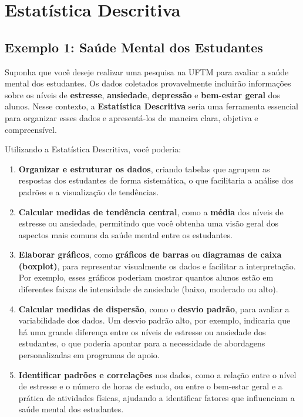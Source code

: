 \documentclass[
]{book}
\providecommand{\tightlist}{%
  \setlength{\itemsep}{0pt}\setlength{\parskip}{0pt}}
\begin{document}
\section{Estatística Descritiva}\label{estatuxedstica-descritiva}

\subsection{\texorpdfstring{Exemplo 1: \textbf{Saúde Mental dos Estudantes}}{Exemplo 1: Saúde Mental dos Estudantes}}\label{exemplo-1-sauxfade-mental-dos-estudantes}

Suponha que você deseje realizar uma pesquisa na UFTM para avaliar a saúde mental dos estudantes. Os dados coletados provavelmente incluirão informações sobre os níveis de \textbf{estresse}, \textbf{ansiedade}, \textbf{depressão} e \textbf{bem-estar geral} dos alunos. Nesse contexto, a \textbf{Estatística Descritiva} seria uma ferramenta essencial para organizar esses dados e apresentá-los de maneira clara, objetiva e compreensível.

Utilizando a Estatística Descritiva, você poderia:

\begin{enumerate}
\def\labelenumi{\arabic{enumi}.}
\tightlist
\item
  \textbf{Organizar e estruturar os dados}, criando tabelas que agrupem as respostas dos estudantes de forma sistemática, o que facilitaria a análise dos padrões e a visualização de tendências.
\item
  \textbf{Calcular medidas de tendência central}, como a \textbf{média} dos níveis de estresse ou ansiedade, permitindo que você obtenha uma visão geral dos aspectos mais comuns da saúde mental entre os estudantes.
\item
  \textbf{Elaborar gráficos}, como \textbf{gráficos de barras} ou \textbf{diagramas de caixa (boxplot)}, para representar visualmente os dados e facilitar a interpretação. Por exemplo, esses gráficos poderiam mostrar quantos alunos estão em diferentes faixas de intensidade de ansiedade (baixo, moderado ou alto).
\item
  \textbf{Calcular medidas de dispersão}, como o \textbf{desvio padrão}, para avaliar a variabilidade dos dados. Um desvio padrão alto, por exemplo, indicaria que há uma grande diferença entre os níveis de estresse ou ansiedade dos estudantes, o que poderia apontar para a necessidade de abordagens personalizadas em programas de apoio.
\item
  \textbf{Identificar padrões e correlações} nos dados, como a relação entre o nível de estresse e o número de horas de estudo, ou entre o bem-estar geral e a prática de atividades físicas, ajudando a identificar fatores que influenciam a saúde mental dos estudantes.
\end{enumerate}
\end{document}
